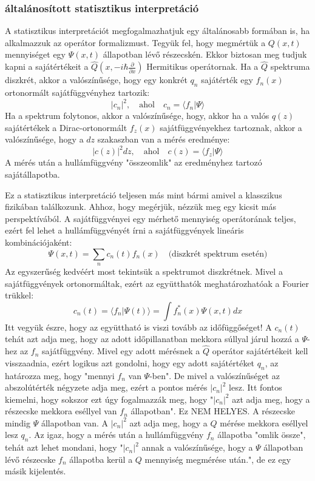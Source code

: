 \documentclass[../main.tex]{subfiles}
\begin{document}
\subsubsection{általánosított statisztikus interpretáció}
A statisztikus interpretációt megfogalmazhatjuk egy általánosabb formában is, ha alkalmazzuk az operátor formalizmust. 
Tegyük fel, hogy megmértük a $Q(x,t)$ mennyiséget egy $\Psi(x,t)$ állapotban lévő részecskén. Ekkor biztosan meg tudjuk kapni a sajátértékeit a $\hat{Q}(x, -i \hbar \frac{\partial}{\partial x})$ Hermitikus operátornak.
Ha a $\hat{Q}$ spektruma diszkrét, akkor a valószínűsége, hogy egy konkrét $q_n$ sajátérték egy $f_n(x)$ ortonormált sajátfüggvényhez tartozik:
\begin{equation}
    |c_n|^2, \quad \text{ahol} \quad c_n = \langle f_n | \Psi \rangle
\end{equation}
Ha a spektrum folytonos, akkor a valószínűsége, hogy, akkor ha a valós $q(z)$ sajátértékek a Dirac-ortonormált $f_z(x)$ sajátfüggvényekhez tartoznak, akkor a valószínűsége, hogy a $dz$ szakaszban van a mérés eredménye:
\begin{equation}
    |c(z)|^2 dz, \quad \text{ahol} \quad c(z) = \langle f_z | \Psi \rangle
\end{equation}
A mérés után a hullámfüggvény "összeomlik" az eredményhez tartozó sajátállapotba.

Ez a statisztikus interpretáció teljesen más mint bármi amivel a klasszikus fizikában találkozunk. Ahhoz, hogy megérjük, nézzük meg egy kicsit más perspektívából.
A sajátfüggvényei egy mérhető mennyiség operátorának teljes, ezért fel lehet a hullámfüggvényét írni a sajátfüggvények lineáris kombinációjaként:
\begin{equation}
    \Psi(x,t) = \sum_n c_n(t) f_n(x) \quad \text{(diszkrét spektrum esetén)}
\end{equation}
Az egyszerűség kedvéért most tekintsük a spektrumot diszkrétnek. Mivel a sajátfüggvények ortonormáltak, ezért az együtthatók meghatározhatóak a Fourier trükkel:
\begin{equation}
    c_n(t) = \langle f_n | \Psi(t) \rangle = \int f_n^*(x) \Psi(x,t) dx
\end{equation}
Itt vegyük észre, hogy az együttható is viszi tovább az időfüggőséget! A $c_n(t)$ tehát azt adja meg, hogy az adott időpillanatban mekkora súllyal járul hozzá a $\Psi$-hez az $f_n$ sajátfüggvény.
Mivel egy adott mérésnek a $\hat{Q}$ operátor sajátértékeit kell visszaadnia, ezért logikus azt gondolni, hogy egy adott sajátértéket $q_n$, az határozza meg, hogy "mennyi $f_n$ van $\Psi$-ben".
De mivel a valószínűséget az abszolútérték négyzete adja meg, ezért a pontos mérés $|c_n|^2$ lesz. Itt fontos kiemelni, hogy sokszor ezt úgy fogalmazzák meg, hogy "$|c_n|^2$ azt adja meg,
hogy a részecske mekkora eséllyel van $f_n$ állapotban". Ez NEM HELYES. A részecske mindig $\Psi$ állapotban van. A $|c_n|^2$ azt adja meg, hogy a $Q$ mérése mekkora eséllyel lesz $q_n$.
Az igaz, hogy a mérés után a hullámfüggvény $f_n$ állapotba "omlik össze", tehát azt lehet mondani, hogy "$|c_n|^2$ annak a valószínűsége, hogy a $\Psi$ állapotban lévő részecske $f_n$ állapotba kerül a $Q$
mennyiség megmérése után.", de ez egy másik kijelentés. 
\end{document}
